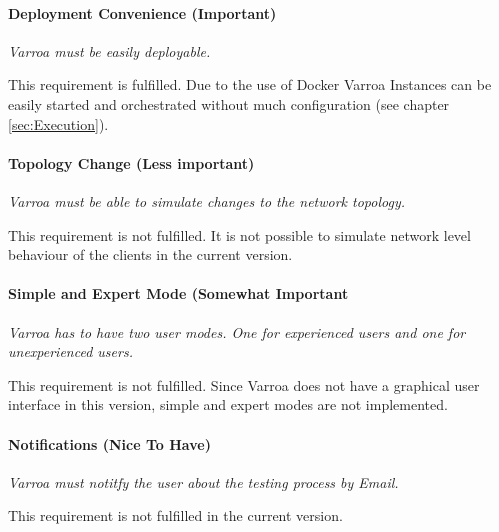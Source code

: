 \paragraph{Deployment Convenience (Important)}
\emph{Varroa must be easily deployable.}

This requirement is fulfilled. Due to the use of Docker Varroa Instances can be easily started and orchestrated without much configuration (see chapter \ref{sec:Execution}).

\paragraph{Topology Change (Less important)}
\emph{Varroa must be able to simulate changes to the network topology.}

This requirement is not fulfilled.
It is not possible to simulate network level behaviour of the clients in the current version.

\paragraph{Simple and Expert Mode (Somewhat Important}
\emph{Varroa has to have two user modes.
One for experienced users and one for unexperienced users.}

This requirement is not fulfilled.
Since Varroa does not have a graphical user interface in this version, simple and expert modes are not implemented.


\paragraph{Notifications (Nice To Have)}
\emph{Varroa must notitfy the user about the testing process by Email.}

This requirement is not fulfilled in the current version.